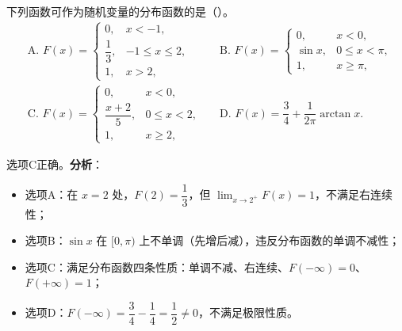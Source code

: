 \documentclass[lang=cn,11pt]{elegantbook}
\begin{document}
\begin{exercise}[分布函数性质判断]
下列函数可作为随机变量的分布函数的是（\quad）。
\[
\begin{aligned}
&\text{A. } F(x)=
\begin{cases}
0, & x<-1, \\[4pt]
\dfrac{1}{3}, & -1\leqslant x\leqslant2, \\[4pt]
1, & x>2,
\end{cases}
&&\text{B. } F(x)=
\begin{cases}
0, & x<0, \\[4pt]
\sin x, & 0\leqslant x<\pi, \\[4pt]
1, & x\geqslant\pi,
\end{cases} \\[10pt]
&\text{C. } F(x)=
\begin{cases}
0, & x<0, \\[4pt]
\dfrac{x+2}{5}, & 0\leqslant x<2, \\[4pt]
1, & x\geqslant2,
\end{cases}
&&\text{D. } F(x)=\dfrac{3}{4}+\dfrac{1}{2\pi}\arctan x.
\end{aligned}
\]
\end{exercise}
\begin{solution}
选项C正确。\textbf{分析}：
\begin{itemize}
    \item 选项A：在 $x=2$ 处，$F(2)=\dfrac{1}{3}$，但 $\displaystyle\lim_{x\to2^+}F(x)=1$，不满足右连续性；
    \item 选项B：$\sin x$ 在 $[0,\pi)$ 上不单调（先增后减），违反分布函数的单调不减性；
    \item 选项C：满足分布函数四条性质：单调不减、右连续、$F(-\infty)=0$、$F(+\infty)=1$；
    \item 选项D：$F(-\infty)=\dfrac{3}{4}-\dfrac{1}{4}=\dfrac{1}{2}\neq0$，不满足极限性质。
\end{itemize}
\end{solution}
\end{document}

